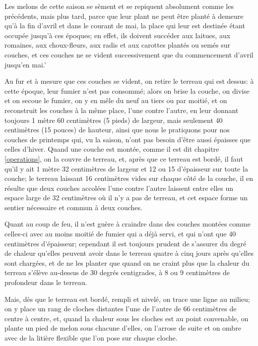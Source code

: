 \documentclass[10pt,a4paper]{book}
\begin{document}
Les melons de cette saison se sèment et se repiquent absolument comme les précédents, mais plus tard, parce que leur plant ne peut être planté à demeure qu'à la fin d'avril et dans le courant de mai, la place qui leur est destinée étant occupée jusqu'à ces époques; en effet, ils doivent succéder aux laitues, aux romaines, aux choux-fleurs, aux radis et aux carottes plantés ou semés sur couches, et ces couches ne se vident successivement que du commencement d'avril jusqu'en mai.'

Au fur et à mesure que ces couches se vident, on retire le terreau qui est dessus: à cette époque, leur fumier n'est pas consommé; alors on brise la couche, on divise et on secoue le fumier, on y en mêle du neuf au tiers ou par moitié, et on reconstruit les couches à la même place, l'une contre l'autre, en leur donnant toujours 1 mètre 60 centimètres (5 pieds) de largeur, mais seulement 40 centimètres (15 pouces) de hauteur, ainsi que nous le pratiquons pour nos couches de printemps qui, vu la saison, n'ont pas besoin d'être aussi épaisses que celles d'hiver. Quand une couche est montée, comme il est dit chapitre \ref{operations}, on la couvre de terreau, et, après que ce terreau est bordé, il faut qu'il y ait 1 mètre 32 centimètres de largeur et 12 ou 15 d'épaisseur sur toute la couche; le terreau laissant 16 centimètres vides sur chaque côté de la couche, il en résulte que deux couches accolées l'une contre l'autre laissent entre elles un espace large de 32 centimètres où il n'y a pas de terreau, et cet espace forme un sentier nécessaire et commun à deux couches.

Quant au coup de feu, il n'est guère à craindre dans des couches montées comme celles-ci avec au moins moitié de fumier qui a déjà servi, et qui n'ont que 40 centimètres d'épaisseur; cependant il est toujours prudent de s'assurer du degré de chaleur qu'elles peuvent avoir dans le terreau quatre à cinq jours après qu'elles sont chargées, et de ne les planter que quand on ne craint plus que la chaleur du terreau s'élève au-dessus de 30 degrés centigrades, à 8 ou 9 centimètres de profondeur dans le terreau.

Mais, dès que le terreau est bordé, rempli et nivelé, on trace une ligne au milieu; on y place un rang de cloches distantes l'une de l'autre de 66 centimètres de centre à centre, et, quand la chaleur sous les cloches est au point convenable, on plante un pied de melon sous chacune d'elles, on l'arrose de suite et on ombre avec de la litière flexible que l'on pose sur chaque cloche.
\end{document}
